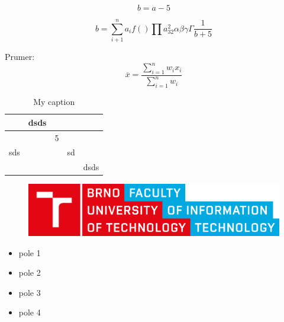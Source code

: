 \documentclass{report}
\begin{document}
	$$ b = a - 5 $$
	 
	\begin{equation}
		b = \sum^{n}_{i + 1} a_i f() \prod a^2_{32}
		\alpha \beta \gamma \Gamma
		\frac{1}{b + 5}
	\end{equation}
	 
	Prumer:
	\begin{equation}
		\overline{x} = \frac{\sum\limits^{n}_{i = 1} w_i x_i}{\sum\limits^{n}_{i = 1} w_i}
	\end{equation}

	\begin{table}[h]
		\centering
		\caption{My caption}
		\label{my-label}
		\begin{tabular}{lllll}
								  & dsds                  &                        &                         &                           \\ \hline
		\multicolumn{1}{|l|}{}    & \multicolumn{1}{l|}{} & \multicolumn{1}{l|}{5} & \multicolumn{1}{l|}{}   & \multicolumn{1}{l|}{}     \\ \hline
		\multicolumn{1}{|l|}{sds} & \multicolumn{1}{l|}{} & \multicolumn{1}{l|}{}  & \multicolumn{1}{l|}{sd} & \multicolumn{1}{l|}{}     \\ \hline
		\multicolumn{1}{|l|}{}    & \multicolumn{1}{l|}{} & \multicolumn{1}{l|}{}  & \multicolumn{1}{l|}{}   & \multicolumn{1}{l|}{dsds} \\ \hline
		\end{tabular}
	\end{table}
	
	\begin{figure}[b]
		\begin{center}
			\includegraphics[width=0.3\linewidth]{logo.pdf}
		\end{center}
	\end{figure}
	
	\begin{itemize}
		\item{pole 1}
		\item{pole 2}
		\item{pole 3}
		\item{pole 4}
	\end{itemize}
\end{document}
